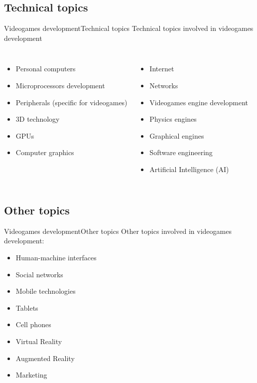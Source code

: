 \documentclass[10pt,compress]{beamer} %
\begin{document}
\subsection{Technical topics}
\begin{frame}{Videogames development}{Technical topics}
	Technical topics involved in videogames development

    \begin{columns}
	\begin{itemize}
		\item Personal computers
		\item Microprocessors development
		\item Peripherals (specific for videogames)
		\item 3D technology 
        \item GPUs
        \item Computer graphics
    \end{itemize}


    \begin{itemize}
		\item Internet
        \item Networks
		\item Videogames engine development
		\item Physics engines
		\item Graphical engines
		\item Software engineering
		\item Artificial Intelligence (AI)
	\end{itemize}
	\end{columns}
\end{frame}

\subsection{Other topics}
\begin{frame}{Videogames development}{Other topics}
	Other topics involved in videogames development:
	\begin{itemize}
		\item Human-machine interfaces
		\item Social networks
		\item Mobile technologies
		\item Tablets
        \item Cell phones
        \item Virtual Reality
        \item Augmented Reality
        \item Marketing
	\end{itemize}
\end{frame}
\end{document}
